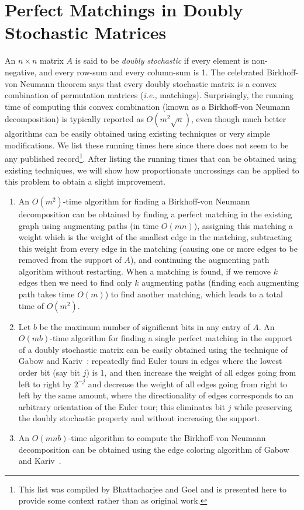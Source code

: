 \documentclass[11pt]{article}
\begin{document}
\section{Perfect Matchings in Doubly Stochastic Matrices}
\label{sec:bvn}
An $n \times n$ matrix $A$ is said to be {\em doubly stochastic} if every element is
non-negative, and every row-sum and every column-sum is 1. The celebrated
Birkhoff-von Neumann theorem says that every doubly stochastic matrix is a
convex combination of permutation matrices ({\em i.e.}, matchings). Surprisingly, the
running time of computing this convex combination (known as a Birkhoff-von
Neumann decomposition) is typically reported as $O(m^2\sqrt{n})$, even though
much better algorithms can be easily obtained using existing techniques or
very simple modifications. We list these running times here since there does
not seem to be any published record\footnote{This list was compiled by
  Bhattacharjee and Goel and is presented here to provide some context rather
  than as original work.}. After listing the running times that can be obtained
using existing techniques, we will show how proportionate uncrossings can be
applied to this problem to obtain a slight improvement.

\begin{enumerate}
\item An $O(m^2)$-time algorithm for finding a Birkhoff-von Neumann
  decomposition can be obtained by finding a perfect matching in the existing
  graph using augmenting paths (in time $O(mn)$), assigning this matching a
  weight which is the weight of the smallest edge in the matching, subtracting
  this weight from every edge in the matching (causing one or more edges to be
  removed from the support of $A$), and continuing the augmenting path
  algorithm without restarting. When a matching is found, if we remove $k$
  edges then we need to find only $k$ augmenting paths (finding each
  augmenting path takes time $O(m)$) to find another matching, which leads to
  a total time of $O(m^2)$.
\item Let $b$ be the maximum number of significant bits in any entry of
  $A$. An $O(mb)$-time algorithm for finding a single perfect matching in the
  support of a doubly stochastic matrix can be easily obtained using the
  technique of Gabow and Kariv~\cite{gk:edge1982}: repeatedly find Euler tours
  in edges where the lowest order bit (say bit $j$) is 1, and then increase
  the weight of all edges going from left to right by $2^{-j}$ and decrease
  the weight of all edges going from right to left by the same amount, where
  the directionality of edges corresponds to an arbitrary orientation of the
  Euler tour; this eliminates bit $j$ while preserving the doubly stochastic
  property and without increasing the support.
\item An $O(mnb)$-time algorithm to compute the Birkhoff-von Neumann
  decomposition can be obtained using the edge coloring algorithm of Gabow and
  Kariv~\cite{gk:edge1982}.
\end{enumerate}
\end{document}
